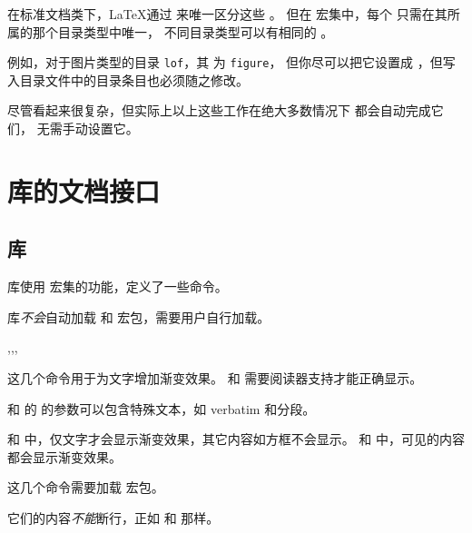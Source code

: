 \documentclass[twoside]{book}
\begin{document}
在标准文档类下，\LaTeX 通过  来唯一区分这些 。
但在 \CusTeX 宏集中，每个  只需在其所属的那个目录类型中唯一，
不同目录类型可以有相同的 。

例如，对于图片类型的目录 \texttt{lof}，其  为 \texttt{figure}，
但你尽可以把它设置成 ，但写入目录文件中的目录条目也必须随之修改。

尽管看起来很复杂，但实际上以上这些工作在绝大多数情况下 \CusTeX 都会自动完成它们，
无需手动设置它。


\chapter{库的文档接口}

\section{库}

 库使用  宏集的功能，定义了一些命令。

 库\emph{不会}自动加载  和  宏包，需要用户自行加载。

\begin{function}{\shadetext,\shadetextbox,\shadecontent,\shadecontentbox}
  \begin{syntax}
    \V\shadetext    {} 
    \V\shadetextbox {} 
    \V\shadecontent    {}  
    \V\shadecontentbox {}  
  \end{syntax}
这几个命令用于为文字增加渐变效果。 和  需要阅读器支持才能正确显示。

 和  的  的参数可以包含特殊文本，如 
verbatim 和分段。

 和  中，仅文字才会显示渐变效果，其它内容如方框不会显示。
 和  中，可见的内容都会显示渐变效果。

这几个命令需要加载  宏包。

它们的内容\emph{不能}断行，正如  和  那样。
\end{function}
\end{document}
